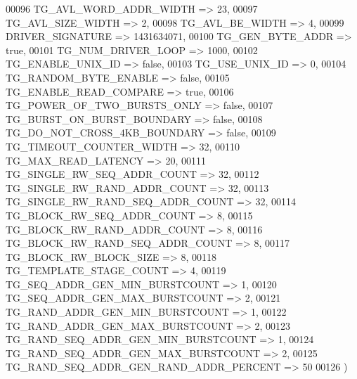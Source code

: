 \begin{DoxyCode}
00096             TG\_AVL\_WORD\_ADDR\_WIDTH                 => \textcolor{vhdllogic}{23},
00097             TG\_AVL\_SIZE\_WIDTH                      => \textcolor{vhdllogic}{2},
00098             TG\_AVL\_BE\_WIDTH                        => \textcolor{vhdllogic}{4},
00099             DRIVER\_SIGNATURE                       => \textcolor{vhdllogic}{1431634071},
00100             TG\_GEN\_BYTE\_ADDR                       => true,
00101             TG\_NUM\_DRIVER\_LOOP                     => \textcolor{vhdllogic}{1000},
00102             TG\_ENABLE\_UNIX\_ID                      => false,
00103             TG\_USE\_UNIX\_ID                         => \textcolor{vhdllogic}{0},
00104             TG\_RANDOM\_BYTE\_ENABLE                  => false,
00105             TG\_ENABLE\_READ\_COMPARE                 => true,
00106             TG\_POWER\_OF\_TWO\_BURSTS\_ONLY            => false,
00107             TG\_BURST\_ON\_BURST\_BOUNDARY             => false,
00108             TG\_DO\_NOT\_CROSS\_4KB\_BOUNDARY           => false,
00109             TG\_TIMEOUT\_COUNTER\_WIDTH               => \textcolor{vhdllogic}{32},
00110             TG\_MAX\_READ\_LATENCY                    => \textcolor{vhdllogic}{20},
00111             TG\_SINGLE\_RW\_SEQ\_ADDR\_COUNT            => \textcolor{vhdllogic}{32},
00112             TG\_SINGLE\_RW\_RAND\_ADDR\_COUNT           => \textcolor{vhdllogic}{32},
00113             TG\_SINGLE\_RW\_RAND\_SEQ\_ADDR\_COUNT       => \textcolor{vhdllogic}{32},
00114             TG\_BLOCK\_RW\_SEQ\_ADDR\_COUNT             => \textcolor{vhdllogic}{8},
00115             TG\_BLOCK\_RW\_RAND\_ADDR\_COUNT            => \textcolor{vhdllogic}{8},
00116             TG\_BLOCK\_RW\_RAND\_SEQ\_ADDR\_COUNT        => \textcolor{vhdllogic}{8},
00117             TG\_BLOCK\_RW\_BLOCK\_SIZE                 => \textcolor{vhdllogic}{8},
00118             TG\_TEMPLATE\_STAGE\_COUNT                => \textcolor{vhdllogic}{4},
00119             TG\_SEQ\_ADDR\_GEN\_MIN\_BURSTCOUNT         => \textcolor{vhdllogic}{1},
00120             TG\_SEQ\_ADDR\_GEN\_MAX\_BURSTCOUNT         => \textcolor{vhdllogic}{2},
00121             TG\_RAND\_ADDR\_GEN\_MIN\_BURSTCOUNT        => \textcolor{vhdllogic}{1},
00122             TG\_RAND\_ADDR\_GEN\_MAX\_BURSTCOUNT        => \textcolor{vhdllogic}{2},
00123             TG\_RAND\_SEQ\_ADDR\_GEN\_MIN\_BURSTCOUNT    => \textcolor{vhdllogic}{1},
00124             TG\_RAND\_SEQ\_ADDR\_GEN\_MAX\_BURSTCOUNT    => \textcolor{vhdllogic}{2},
00125             TG\_RAND\_SEQ\_ADDR\_GEN\_RAND\_ADDR\_PERCENT => \textcolor{vhdllogic}{50}
00126         \textcolor{vhdlchar}{)}

\end{DoxyCode}
